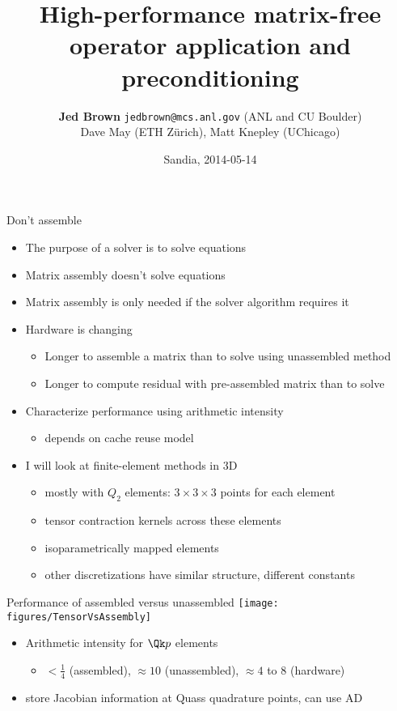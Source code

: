 \documentclass{beamer}
\title{High-performance matrix-free operator application and preconditioning}
\author{{\bf Jed Brown} \texttt{jedbrown@mcs.anl.gov} (ANL and CU Boulder) \\
  \quad Dave May (ETH Z\"urich), Matt Knepley (UChicago)
}
\date{Sandia, 2014-05-14}
\begin{document}
\lstset{language=C}
\normalem

\begin{frame}
  \titlepage
\end{frame}

\begin{frame}{Don't assemble}
  \begin{itemize}
  \item The purpose of a solver is to solve equations
  \item Matrix assembly doesn't solve equations
  \item Matrix assembly is only needed if the solver algorithm requires it
  \item Hardware is changing
    \begin{itemize}
    \item Longer to assemble a matrix than to solve using unassembled method
    \item Longer to compute residual with pre-assembled matrix than to solve
    \end{itemize}
  \item Characterize performance using arithmetic intensity
    \begin{itemize}
    \item depends on cache reuse model
    \end{itemize}
  \item I will look at finite-element methods in 3D
    \begin{itemize}
    \item mostly with $Q_2$ elements: $3\times 3\times 3$ points for each element
    \item tensor contraction kernels across these elements
    \item isoparametrically mapped elements
    \item other discretizations have similar structure, different constants
    \end{itemize}
  \end{itemize}
\end{frame}



\begin{frame}[shrink=5]{Performance of assembled versus unassembled}
  \vspace{1ex}
  \texttt{[image: figures/TensorVsAssembly]} \\
  \begin{itemize}
  \item Arithmetic intensity for $\Qk p$ elements
    \begin{itemize}
    \item $< \frac 1 4$ (assembled), $\approx 10$ (unassembled), $\approx 4$ to $8$ (hardware)
    \end{itemize}
  \item store Jacobian information at Quass quadrature points, can use AD
  \end{itemize}
\end{frame}
\end{document}
